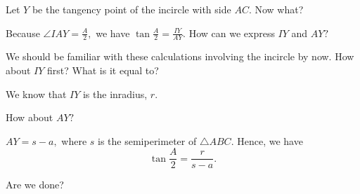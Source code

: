 Let $Y$ be the tangency point of the incircle with side $AC.$ Now what?







Because $\displaystyle \angle IAY = \frac{A}{2},$ we have $\displaystyle \tan\frac{A}{2} = \frac{IY}{AY}.$  How can we express $IY$ and $AY?$

We should be familiar with these calculations involving the incircle by now. How about $IY$ first? What is it equal to?





We know that $IY$ is the inradius, $r.$

How about $AY?$




$AY = s - a,$ where $s$ is the semiperimeter of $\triangle ABC.$ Hence, we have $$\displaystyle\tan\frac{A}{2} = \frac{ r}{s-a}.$$

Are we done?

